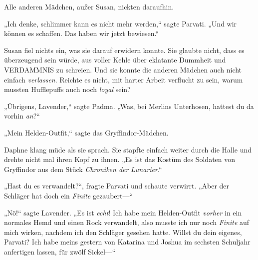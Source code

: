 Alle anderen Mädchen, außer Susan, nickten daraufhin.

„Ich denke, schlimmer kann es nicht mehr werden,“ sagte Parvati. „Und wir können es schaffen. Das haben wir jetzt bewiesen.“

Susan fiel nichts ein, was sie darauf erwidern konnte. Sie glaubte nicht, dass es überzeugend sein würde, aus voller Kehle über eklatante Dummheit und VERDAMMNIS zu schreien. Und sie konnte die anderen Mädchen auch nicht einfach \emph{verlassen}. Reichte es nicht, mit harter Arbeit verflucht zu sein, warum mussten Hufflepuffs auch noch \emph{loyal} sein?

„Übrigens, Lavender,“ sagte Padma. „Was, bei Merlins Unterhosen, hattest du da vorhin \emph{an}?“

„Mein Helden-Outfit,“ sagte das Gryffindor-Mädchen.

Daphne klang müde als sie sprach. Sie stapfte einfach weiter durch die Halle und drehte nicht mal ihren Kopf zu ihnen. „Es ist das Kostüm des Soldaten von Gryffindor aus dem Stück \emph{Chroniken der} \emph{Lunarier}.“%

„Hast du es verwandelt?“, fragte Parvati und schaute verwirrt. „Aber der Schläger hat doch ein \emph{Finite} gezaubert—“

„Nö!“ sagte Lavender. „Es ist \emph{echt}! Ich habe mein Helden-Outfit \emph{vorher} in ein normales Hemd und einen Rock verwandelt, also musste ich nur noch \emph{Finite} auf mich wirken, nachdem ich den Schläger gesehen hatte. Willst du dein eigenes, Parvati? Ich habe meins gestern von Katarina und Joshua im sechsten Schuljahr anfertigen lassen, für zwölf Sickel—“

